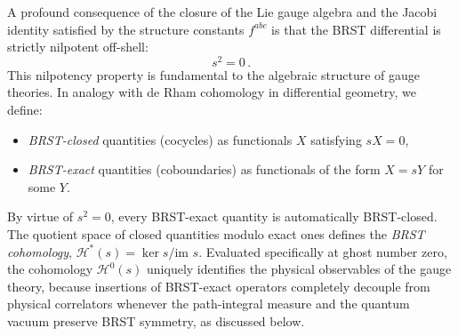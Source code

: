 A profound consequence of the closure of the Lie gauge algebra and the Jacobi identity satisfied by the structure constants \(f^{abc}\) is that the BRST differential is strictly nilpotent off-shell:
\begin{equation} \label{eq:brst_nilpotency}
    s^2 = 0 \, .
\end{equation}
This nilpotency property is fundamental to the algebraic structure of gauge theories. In analogy with de Rham cohomology in differential geometry, we define:
\begin{itemize}
    \item \textit{BRST-closed} quantities (cocycles) as functionals \(X\) satisfying \(sX = 0\),
    \item \textit{BRST-exact} quantities (coboundaries) as functionals of the form \(X = sY\) for some \(Y\).
\end{itemize}
By virtue of \(s^2 = 0\), every BRST-exact quantity is automatically BRST-closed. The quotient space of closed quantities modulo exact ones defines the \textit{BRST cohomology}, \(\mathcal{H}^*(s) = \ker s / \text{im } s\). Evaluated specifically at ghost number zero, the cohomology \(\mathcal{H}^0(s)\) uniquely identifies the physical observables of the gauge theory, because insertions of BRST-exact operators completely decouple from physical correlators whenever the path-integral measure and the quantum vacuum preserve BRST symmetry, as discussed below.

